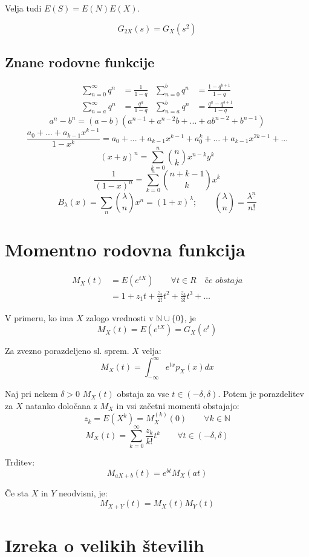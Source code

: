 \begin{multicols}{5}
Velja tudi $E(S) = E(N)E(X)$.

\[ G_{2X}(s) = G_X(s^2)\]

\subsection{Znane rodovne funkcije}
\[
    \begin{aligned}
        \sum_{n=0}^{\infty} q^n &= \frac{1}{1-q} &
        \sum_{n=0}^{b} q^n &= \frac{1-q^{b+1}}{1-q}
        \\
        \sum_{n=a}^{\infty} q^n &= \frac{q^{a}}{1-q} &
        \sum_{n=a}^{b} q^n &= \frac{q^a-q^{b+1}}{1-q}
    \end{aligned}
\]
\[
    a^n - b^n = (a-b)(a^{n-1} + a^{n-2}b + ... + ab^{n-2} + b^{n-1})  
\]
\[ \textstyle \frac{a_0 + ... + a_{k-1}x^{k-1}}{1-x^k} = a_0 + ... + a_{k-1}x^{k-1} + a_0^k + ... + a_{k-1}x^{2k-1} + ...\]
\[ (x+y)^n = \sum_{k=0}^{n} \binom{n}{k} x^{n-k}y^{k} \]
\[ \frac{1}{(1-x)^n} = \sum_{k=0}^{n} \binom{n+k-1}{k} x^{k} \]
\[ B_\lambda(x) = \sum_{n} \binom{\lambda}{n} x^{n} = (1+x)^\lambda; \qquad \binom{\lambda}{n} = \frac{\lambda^{\underline{n}}}{n!}\]


\section{Momentno rodovna funkcija}
\begin{align*}
	M_X(t) &= E(e^{tX}) \qquad \forall t \in R \quad \textit{če obstaja} \\
	&= 1 + z_1t + \frac{z_2}{2!} t^2 + \frac{z_3}{3!} t^3 + \dots 
\end{align*} 

V primeru, ko ima $X$ zalogo vrednosti v $\mathbb{N} \cup \{0\}$, je 
\[M_X(t) = E(e^{tX}) = G_X(e^t) \]

Za zvezno porazdeljeno sl. sprem. $X$ velja:
\[ M_X(t) = \int_{-\infty}^\infty e^{tx} p_X(x) dx \]


Naj pri nekem $\delta > 0$ $M_X(t)$ obstaja za vse $t \in (-\delta, \delta)$.
Potem je porazdelitev za $X$ natanko določana z $M_X$ in vsi začetni momenti obstajajo:
\[ z_k = E(X^k) = M_X^{(k)}(0) \qquad \forall k \in \mathbb{N}\]
\[ M_X(t) = \sum_{k=0}^\infty \frac{z_k}{k!}t^k \qquad \forall t \in (-\delta, \delta)\] 

Trditev:
\[M_{aX+b}(t) = e^{bt} M_X(at) \]

Če sta $X$ in $Y$ neodvisni, je:
\[ M_{X+Y} (t) = M_X(t) M_Y(t)\]

\section{Izreka o velikih številih}


\end{multicols}
